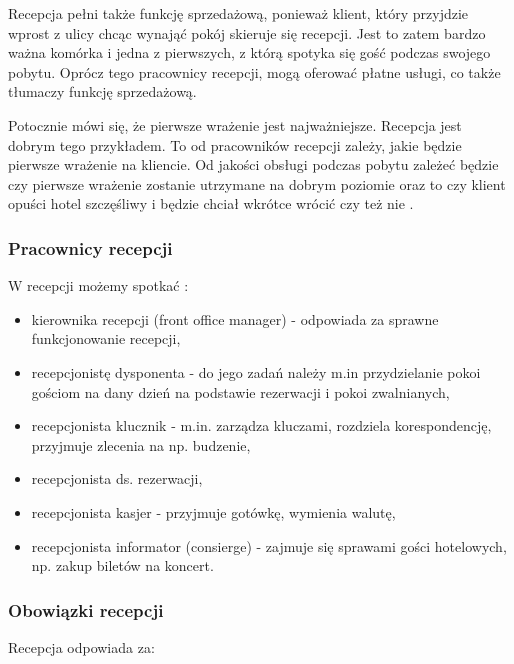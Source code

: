 \documentclass[a4paper,onecolumn,oneside,11pt,wide,floatssmall]{mwrep}
\theoremstyle{definition}
\theoremstyle{plain}%
\theoremstyle{remark}
\begin{document}
Recepcja pełni także funkcję sprzedażową, ponieważ klient, 
który przyjdzie wprost z ulicy chcąc wynająć pokój skieruje się recepcji. 
Jest to zatem  bardzo ważna komórka i jedna z pierwszych, z którą spotyka 
się gość podczas swojego pobytu. Oprócz tego pracownicy recepcji, mogą 
oferować płatne usługi, co także tłumaczy funkcję sprzedażową.

Potocznie mówi się, że pierwsze wrażenie jest najważniejsze. Recepcja jest 
dobrym tego przykładem. To od pracowników recepcji zależy, jakie będzie 
pierwsze wrażenie na kliencie. Od jakości obsługi podczas pobytu zależeć 
będzie czy pierwsze wrażenie zostanie utrzymane na dobrym poziomie oraz to 
czy klient opuści hotel szczęśliwy i będzie chciał wkrótce wrócić czy też nie
.


\subsubsection{Pracownicy recepcji}
W recepcji możemy spotkać \cite[47-51]{OrgaDzialHot}:

\begin{itemize}
  \item kierownika recepcji (front office manager) - odpowiada za sprawne 
  funkcjonowanie recepcji,
  \item recepcjonistę dysponenta - do jego zadań należy m.in przydzielanie 
  pokoi gościom na dany dzień na podstawie rezerwacji i pokoi zwalnianych,
  \item recepcjonista klucznik - m.in. zarządza kluczami, rozdziela 
  korespondencję, przyjmuje zlecenia na np. budzenie,
  \item recepcjonista ds. rezerwacji,
  \item recepcjonista kasjer - przyjmuje gotówkę, wymienia walutę,
  \item recepcjonista informator (consierge) - zajmuje się sprawami gości 
  hotelowych, np. zakup biletów na koncert.
\end{itemize}

\subsubsection{Obowiązki recepcji} 
Recepcja odpowiada za\cite[50]{OrgaDzialHot}:
\end{document}

